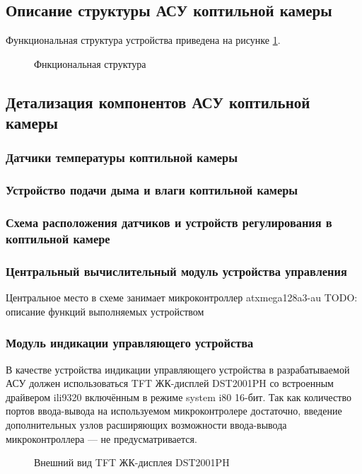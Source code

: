 \subsection{Описание структуры АСУ коптильной камеры}

Функциональная структура устройства приведена на рисунке \ref{img:funcd}.
\begin{figure}[h]
	\caption{Фнкциональная структура}
	\label{img:funcd}
\end{figure}


\subsection{Детализация компонентов АСУ коптильной камеры}

\subsubsection{Датчики температуры коптильной камеры}

\subsubsection{Устройство подачи дыма и влаги коптильной камеры}

\subsubsection{Схема расположения датчиков и устройств регулирования в коптильной камере}

\subsubsection{Центральный вычислительный модуль устройства управления}
Центральное место в схеме занимает микроконтроллер atxmega128a3-au
TODO: описание функций выполняемых устройством

\subsubsection{Модуль индикации управляющего устройства}
\begin{par}
В качестве устройства индикации управляющего устройства в разрабатываемой АСУ должен использоваться TFT
ЖК-дисплей DST2001PH\cite{display} со встроенным драйвером ili9320 включённым в режиме system
i80 16-бит\cite{ili9320}.
Так как количество портов ввода-вывода на используемом микроконтролере достаточно, введение дополнительных узлов
расширяющих возможности ввода-вывода микроконтроллера --- не предусматривается.
\begin{figure}[h]
	\caption{Внешний вид TFT ЖК-дисплея DST2001PH}
	\label{img:iili9320}
\end{figure}
\end{par}

